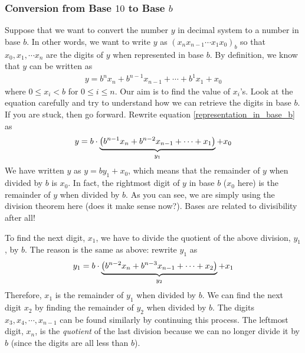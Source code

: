 \subsubsection{Conversion from Base $10$ to Base $b$}
Suppose that we want to convert the number $y$ in decimal system to a number in base $b$. In other words, we want to write $y$ as $(x_{n}x_{n-1}\cdots x_1x_0)_b$ so that $x_0, x_1, \cdots x_n$ are the digits of $y$ when represented in base $b$. By definition, we know that $y$ can be written as
\begin{align}\label{representation_in_base_b}
	y = b^{n} x_{n} + b^{n-1} x_{n-1} + \cdots + b^1x_1 + x_0
\end{align}
where $0 \leq x_i < b$ for $0 \leq i \leq n$. Our aim is to find the value of $x_i$'s. Look at the equation carefully and try to understand how we can retrieve the digits in base $b$. If you are stuck, then go forward. Rewrite equation \eqref{representation_in_base_b} as
\begin{align*}
	y = b \cdot \underbrace{\left(b^{n-1} x_{n} + b^{n-2} x_{n-1} + \cdots + x_1\right)}_{y_1} + x_0
\end{align*}
We have written $y$ as $y=by_1 + x_0$, which means that the remainder of $y$ when divided by $b$ is $x_0$. In fact, the rightmost digit of $y$ in base $b$ ($x_0$ here) is the remainder of $y$ when divided by $b$. As you can see, we are simply using the division theorem here (does it make sense now?). Bases are related to divisibility after all!

To find the next digit, $x_1$, we have to divide the quotient of the above division, $y_1$, by $b$. The reason is the same as above: rewrite $y_1$ as
\begin{align*}
	y_1 = b \cdot \underbrace{\left(b^{n-2} x_{n} + b^{n-3} x_{n-1} + \cdots + x_2\right)}_{y_2} + x_1
\end{align*}
Therefore, $x_1$ is the remainder of $y_1$ when divided by $b$. We can find the next digit $x_2$ by finding the remainder of $y_2$ when divided by $b$. The digits $x_3, x_4, \cdots, x_{n-1}$ can be found similarly by continuing this process. The leftmost digit, $x_n$, is the \textit{quotient} of the last division because we can no longer divide it by $b$ (since the digits are all less than $b$).

